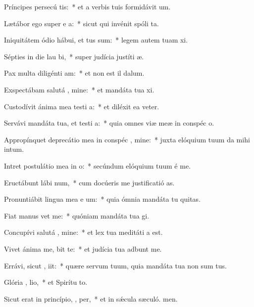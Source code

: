 \item Príncipes persecú   tis:~* et a verbis tuis formidávit  um.
\item Lætábor ego super e a:~* sicut qui invénit spóli ta.
\item Iniquitátem ódio hábui, et tus sum:~* legem autem tuam xi.
\item Sépties in die lau  bi,~* super judícia justíti æ.
\item Pax multa diligénti  am:~* et non est il dalum.
\item Exspectábam salutá , mine:~* et mandáta tua xi.
\item Custodívit ánima mea testi a:~* et diléxit ea veter.
\item Servávi mandáta tua, et testi a:~* quia omnes viæ meæ in conspéc o.
\item Appropínquet deprecátio mea in conspéc , mine:~* juxta elóquium tuum da mihi intum.
\item Intret postulátio mea in  o:~* secúndum elóquium tuum é me.
\item Eructábunt lábi  num,~* cum docúeris me justificatió as.
\item Pronuntiábit lingua mea e um:~* quia ómnia mandáta tu quitas.
\item Fiat manus   vet me:~* quóniam mandáta tua gi.
\item Concupívi salutá , mine:~* et lex tua meditáti a est.
\item Vivet ánima me,  bit te:~* et judícia tua adbunt me.
\item Errávi, sicut ,  iit:~* quære servum tuum, quia mandáta tua non sum tus.
\item Glória ,  lio,~* et Spirítu to.
\item Sicut erat in princípio,  ,  per,~* et in sǽcula sæculó. men.
